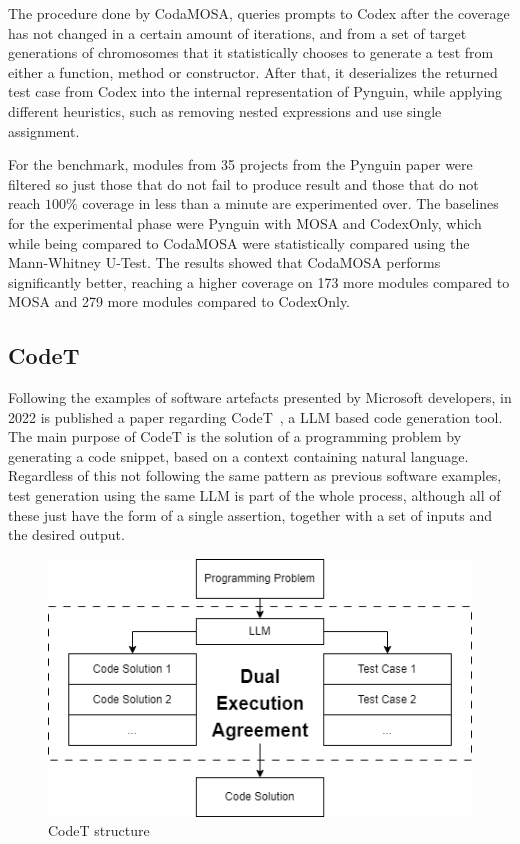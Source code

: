 \documentclass[%
  chapterprefix=false,%
  open=right,%
  twoside=true,%
  paper=a4,%
  logofile={Figures/logo.png},%
  thesistype=master,%
  UKenglish,%
]{se2thesis}
\begin{document}
The procedure done by CodaMOSA, queries prompts to Codex after the coverage has not changed in a certain amount of iterations, and from a set of target generations of chromosomes that it statistically chooses to generate a test from either a function, method or constructor.
After that, it deserializes the returned test case from Codex into the internal representation of Pynguin, while applying different heuristics, such as removing nested expressions and use single assignment.

For the benchmark, modules from 35 projects from the Pynguin paper were filtered so just those that do not fail to produce result and those that do not reach \(100\%\) coverage in less than a minute are experimented over.
The baselines for the experimental phase were Pynguin with MOSA and CodexOnly, which while being compared to CodaMOSA were statistically compared using the Mann-Whitney U-Test.
The results showed that CodaMOSA performs significantly better, reaching a higher coverage on 173 more modules compared to MOSA and 279 more modules compared to CodexOnly.

\subsection{CodeT}

Following the examples of software artefacts presented by Microsoft developers, in 2022 is published a paper regarding CodeT~\cite{DBLP:journals/corr/abs-2207-10397}, a LLM based code generation tool.
The main purpose of CodeT is the solution of a programming problem by generating a code snippet, based on a context containing natural language.
Regardless of this not following the same pattern as previous software examples, test generation using the same LLM is part of the whole process, although all of these just have the form of a single assertion, together with a set of inputs and the desired output.

\begin{figure}[tb]
  \centering 
  \includegraphics[width=.99\textwidth]{Figures/codet.png}
  \caption{CodeT structure}\label{fig:codet}
\end{figure}
\end{document}

